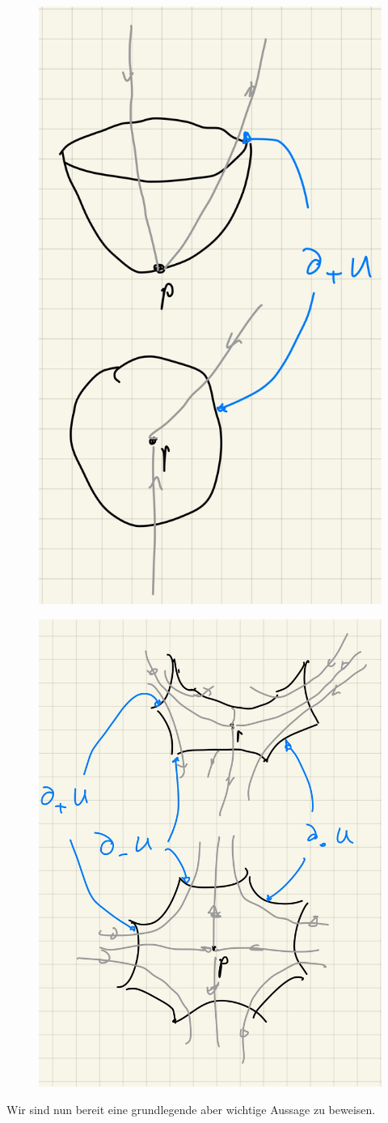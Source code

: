\begin{definition}
    \begin{figure}[H]
        \centering
        \begin{minipage}{.4\textwidth}
          \centering
          \includegraphics[width=.4\linewidth]{../resources/def-notation-morse-umgebung-1.JPG}
          \label{fig: morse umgebung ind 0}
        \end{minipage}%
        \begin{minipage}{.4\textwidth}
          \centering
          \includegraphics[width=.4\linewidth]{../resources/def-notation-morse-umgebung-2.JPG}
          \label{fig: morse umgebung ind k}
        \end{minipage}
    \end{figure}
\end{definition}

Wir sind nun bereit eine grundlegende aber wichtige Aussage zu beweisen.

